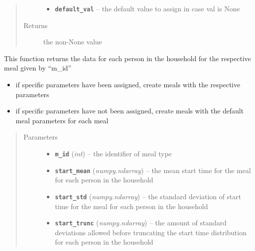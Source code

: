 \documentclass[letterpaper,10pt,english]{sphinxmanual}
\begin{document}
\begin{fulllineitems}
\begin{fulllineitems}
\begin{quote}
\begin{description}
\begin{itemize}
\item {} 
\textbf{\texttt{default\_val}} -- the default value to assign in case val is None

\end{itemize}

\item[{Returns}] \leavevmode
the non-None value

\end{description}\end{quote}

\end{fulllineitems}


\begin{fulllineitems}
\label{params:params.Params.init_meal}
This function returns the data for each person in the household for the respective meal given by ``m\_id''
\begin{itemize}
\item {} 
if specific parameters have been assigned, create meals with the respective parameters

\item {} 
if specific parameters have not been assigned, create meals with the default meal parameters for         each meal

\end{itemize}
\begin{quote}\begin{description}
\item[{Parameters}] \leavevmode\begin{itemize}
\item {} 
\textbf{\texttt{m\_id}} (\emph{int}) -- the identifier of meal type

\item {} 
\textbf{\texttt{start\_mean}} (\emph{numpy.ndarray}) -- the mean start time for the meal for each person in the household

\item {} 
\textbf{\texttt{start\_std}} (\emph{numpy.ndarray}) -- the standard deviation of start time for the meal for each person in         the household

\item {} 
\textbf{\texttt{start\_trunc}} (\emph{numpy.ndarray}) -- the amount of standard deviations allowed before truncating the         start time distribution for each person in the household


\end{itemize}
\end{description}
\end{quote}
\end{fulllineitems}
\end{fulllineitems}
\end{document}
